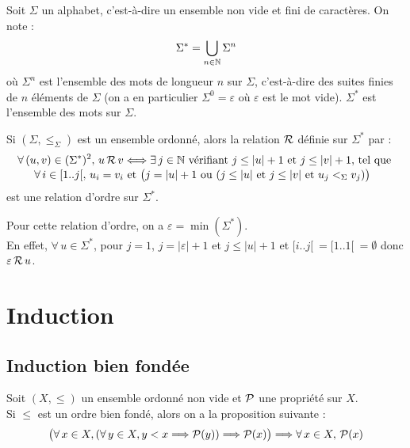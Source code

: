 			
			\begin{Rappel}
				Soit \(\Sigma\) un alphabet, c'est-à-dire un ensemble non vide et fini de caractères. On note :
					\[
						\displaystyle \Sigma^* = \bigcup_{n \in \bb{N}} \Sigma^n
					\]
				où \(\Sigma^n\) est l'ensemble des mots de longueur \(n\) sur \(\Sigma\), c'est-à-dire des suites finies de \(n\)	éléments de \(\Sigma\) (on a en particulier \(\Sigma^0 = \varepsilon\) où \(\varepsilon\) est le mot vide). \nt
				\(\Sigma^*\) est l'ensemble des mots sur \(\Sigma\).
			\end{Rappel}
			
			\eqskip{3mm}
			\begin{Definition}
				Si \((\Sigma, \leqslant_\Sigma)\) est un ensemble ordonné, alors la relation \(\cal{R}\) définie sur \(\Sigma^*\) par :
					\begin{align*}
						\forall \,(u,v) \in (\Sigma^*)^2, \,u \,\cal{R}\, v & \iff \exists \,j \in \bb{N} \text{ vérifiant } j \leq |u|+1 \text{ et } j \leq |v|+1 \text{, tel que } \\[-1mm]
						\forall \,i \in [1..j[, \,u_i = v_i &\text{ et } \big(j = |u|+1 \text{ ou } (j \leq |u| \text{ et } j \leq |v| \text{ et } u_j <_{\Sigma} v_j) \big)
					\end{align*}
				est une relation d'ordre sur \(\Sigma^*\). 
			\end{Definition}
			
			\begin{Remarque}
				Pour cette relation d'ordre, on a \(\varepsilon = \min(\Sigma^*)\). \\
				En effet, \(\forall \,u \in \Sigma^*\), pour \(j=1\), \(j=|\varepsilon|+1\) et \(j \leq |u|+1\) et \([i..j[ \ = [1..1[ \ = \emptyset\) donc \(\varepsilon \,\cal{R}\, u\).
			\end{Remarque}
			
			
\section{Induction}

	\subsection{Induction bien fondée}
		
		 \eqskip{2mm}
		\begin{Proposition}
			Soit \((X,\leqslant)\) un ensemble ordonné non vide et \(\cal{P}\) une propriété sur \(X\). \\
			Si \(\leqslant\) est un ordre bien fondé, alors on a la proposition suivante :
				\[
					\big(\forall \,x \in X, (\forall \,y \in X, y < x \Longrightarrow \cal{P}(y)) \Longrightarrow \cal{P}(x)\big) \Longrightarrow \forall \,x \in X, \, \cal{P}(x)
				\]
		\end{Proposition}
		
